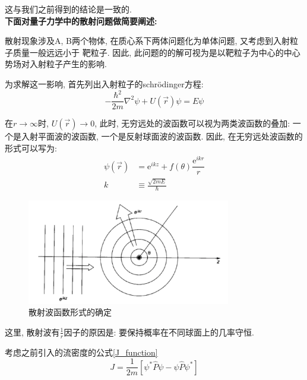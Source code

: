 \documentclass[a4paper, 11pt]{article}
\begin{document}
\begin{spacing}{1.2}
          这与我们之前得到的结论是一致的. 
          \ \\

          \textbf{下面对量子力学中的散射问题做简要阐述:}

          散射现象涉及A, B两个物体, 在质心系下两体问题化为单体问题, 又考虑到入射粒子质量一般远远小于
          靶粒子. 因此, 此问题的的解可视为是以靶粒子为中心的中心势场对入射粒子产生的影响. 

          为求解这一影响, 首先列出入射粒子的schr\"odinger方程:
          \begin{equation}
            -\frac{\hbar^2}{2m} \nabla^2\psi + U(\vec{r})\psi = E\psi
          \end{equation}

          在$r\to\infty$时, $U(\vec{r})\to0$, 此时, 无穷远处的波函数可以视为两类波函数的叠加:
          一个是入射平面波的波函数, 一个是反射球面波的波函数. 因此, 在无穷远处波函数的形式可以写为:
          \begin{equation}
            \begin{aligned}
              \psi(\vec{r}) &= \mathrm{e}^{ikz} + f(\theta)\dfrac{\mathrm{e}^{ikr}}{r} \\
              k &\equiv \frac{\sqrt{2mE}}{\hbar}
            \end{aligned}
          \end{equation}

          \begin{figure}
            \centering\includegraphics[width=3.5in]{image/quantum_scatterting_psi}
            \caption{散射波函数形式的确定}\label{quantum_scatterting_psi} 
          \end{figure}

          这里, 散射波有$\frac{1}{r}$因子的原因是: 要保持概率在不同球面上的几率守恒.
          
          考虑之前引入的流密度的公式\eqref{J_function}
          \begin{equation}   
            J = \frac{1}{2m}\left[\psi^{*}\hat{P}\psi-\psi\hat{P}\psi^{*}\right]    
          \end{equation}


\end{spacing}
\end{document}
